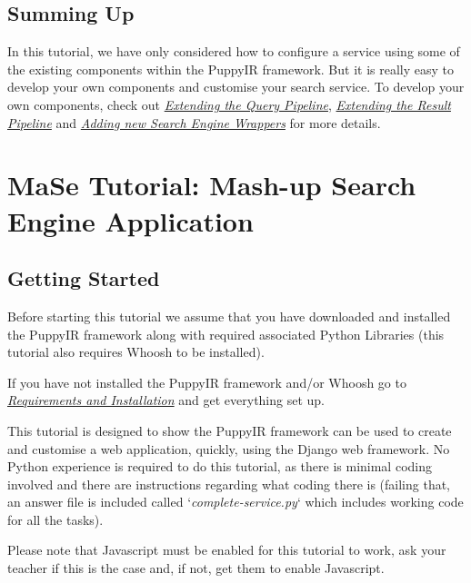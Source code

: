 \documentclass[letterpaper,10pt,english]{sphinxmanual}
\begin{document}
\subsection{Summing Up}
\label{ifse-tutorial:summing-up}
In this tutorial, we have only considered how to configure a service using some of the existing components within the PuppyIR framework. But it is really easy to develop your own components and customise your search service. To develop your own components, check out {\hyperref[extendingQuery:extending-the-query-pipeline]{\emph{Extending the Query Pipeline}}}, {\hyperref[extendingResult:extending-the-result-pipeline]{\emph{Extending the Result Pipeline}}} and {\hyperref[extendingSearchEngine:extending-the-search-engine]{\emph{Adding new Search Engine Wrappers}}} for more details.


\section{MaSe Tutorial: Mash-up Search Engine Application}
\label{mase-tutorial:mase-mash-up-search-engine-puppyir-tutorial}\label{mase-tutorial:mase-tutorial-mash-up-search-engine-application}\label{mase-tutorial::doc}

\subsection{Getting Started}
\label{mase-tutorial:getting-started}
Before starting this tutorial we assume that you have downloaded and installed the PuppyIR framework along with required associated Python Libraries (this tutorial also requires Whoosh to be installed).

If you have not installed the PuppyIR framework and/or Whoosh go to {\hyperref[installation:requirements-and-installation]{\emph{Requirements and Installation}}} and get everything set up.

This tutorial is designed to show the PuppyIR framework can be used to create and customise a web application, quickly, using the Django web framework. No Python experience is required to do this tutorial, as there is minimal coding involved and there are instructions regarding what coding there is (failing that, an answer file is included called `\emph{complete-service.py}` which includes working code for all the tasks).

Please note that Javascript must be enabled for this tutorial to work, ask your teacher if this is the case and, if not, get them to enable Javascript.
\end{document}
